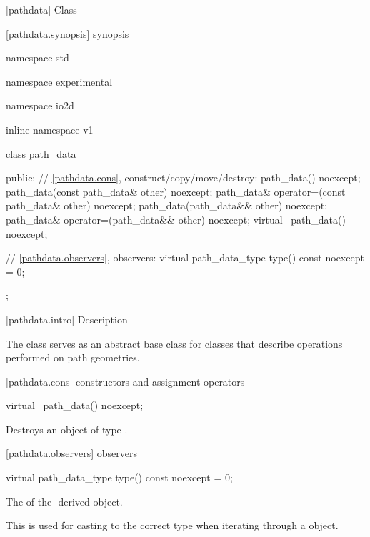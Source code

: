  [pathdata] {Class }

 [pathdata.synopsis] { synopsis}

\begin{codeblock}
namespace std { namespace experimental { namespace io2d { inline namespace v1 {
  class path_data {
  public:
    // \ref{pathdata.cons}, construct/copy/move/destroy:
    path_data() noexcept;
    path_data(const path_data& other) noexcept;
    path_data& operator=(const path_data& other) noexcept;
    path_data(path_data&& other) noexcept;
    path_data& operator=(path_data&& other) noexcept;
    virtual ~path_data() noexcept;

    // \ref{pathdata.observers}, observers:
    virtual path_data_type type() const noexcept = 0;
  };
} } } }
\end{codeblock}

 [pathdata.intro] { Description}

\pnum
{}
The class  serves as an abstract base class for classes that describe operations performed on path geometries.

 [pathdata.cons] { constructors and assignment operators}

\begin{itemdecl}
    virtual ~path_data() noexcept;
\end{itemdecl}
\begin{itemdescr}
	\pnum
	\effects
	Destroys an object of type .
	
\end{itemdescr}

 [pathdata.observers]{ observers}

\begin{itemdecl}
    virtual path_data_type type() const noexcept = 0;
\end{itemdecl}
\begin{itemdescr}
	\pnum
	\returns
	The  of the -derived object.
	
	\pnum
	\realnote
	This is used for casting to the correct type when iterating through a  object.
\end{itemdescr}
